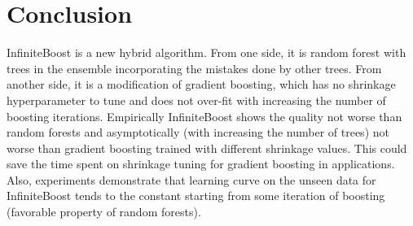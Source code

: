 \section{Conclusion}
InfiniteBoost is a new hybrid algorithm. 
From one side, it is random forest with trees in the ensemble incorporating the mistakes done by other trees.
From another side, it is a modification of gradient boosting, which has no shrinkage hyperparameter to tune and does not over-fit with increasing the number of boosting iterations.
Empirically InfiniteBoost shows the quality not worse than random forests and asymptotically (with increasing the number of trees) not worse than gradient boosting trained with different shrinkage values.
This could save the time spent on shrinkage tuning for gradient boosting in applications.
Also, experiments demonstrate that learning curve on the unseen data for InfiniteBoost tends to the constant starting from some iteration of boosting (favorable property of random forests).
\clearpagebiblio
